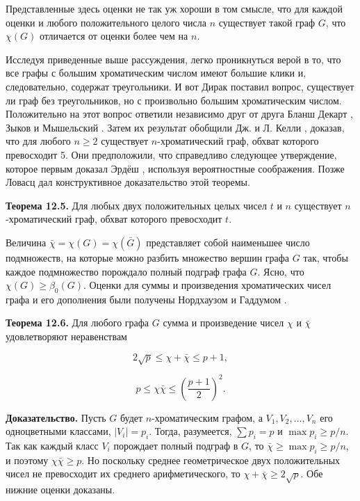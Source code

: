 Представленные здесь оценки не так уж хороши в том смысле, что для каждой оценки и любого положительного целого числа $n$ существует такой граф $G$, что $\chi(G)$ отличается от оценки более чем на $n$.

Исследуя приведенные выше рассуждения, легко проникнуться верой в то, что все графы с большим хроматическим числом имеют большие клики и, следовательно, содержат треугольники. И вот Дирак \cite{Dirac} поставил вопрос, существует ли граф без треугольников, но с произвольно большим хроматическим числом. Положительно на этот вопрос ответили независимо друг от друга Бланш Декарт \cite{Blanche}, Зыков \cite{Zykov} и Мышельский \cite{Myshelski}. Затем их результат обобщили Дж. и Л. Келли \cite{Kelly}, доказав, что для любого $n \geq 2$ существует $n$-хроматический граф, обхват которого превосходит 5. Они предположили, что справедливо следующее утверждение, которое первым доказал Эрдёш \cite{Erdos}, используя вероятностные соображения. Позже Ловасц \cite{Lovasz} дал конструктивное доказательство этой теоремы.

\textbf{Теорема 12.5.} Для любых двух положительных целых чисел $t$ и $n$ существует $n$-хроматический граф, обхват которого превосходит $t$.

Величина $\bar{\chi} = \chi(G) = \chi(\bar{G})$ представляет собой наименьшее число подмножеств, на которые можно разбить множество вершин графа $G$ так, чтобы каждое подмножество порождало полный подграф графа $G$. Ясно, что $\chi(G) \geq \beta_0(G)$. Оценки для суммы и произведения хроматических чисел графа и его дополнения были получены Нордхаузом и Гаддумом \cite{Nordhaus}.

\textbf{Теорема 12.6.} Для любого графа $G$ сумма и произведение чисел $\chi$ и $\bar{\chi}$ удовлетворяют неравенствам

\begin{equation}
2\sqrt{p} \leq \chi + \bar{\chi} \leq p + 1, \tag{12.4}
\end{equation}

\begin{equation}
p \leq \chi \bar{\chi} \leq \left( \frac{p + 1}{2} \right)^2. \tag{12.5}
\end{equation}

\textbf{Доказательство.} Пусть $G$ будет $n$-хроматическим графом, а $V_1, V_2, \ldots, V_n$ его одноцветными классами, $|V_i| = p_i$. Тогда, разумеется, $\sum p_i = p$ и $\max p_i \geq p/n$. Так как каждый класс $V_i$ порождает полный подграф в $G$, то $\bar{\chi} \geq \max p_i \geq p/n$, и поэтому $\chi \bar{\chi} \geq p$. Но поскольку среднее геометрическое двух положительных чисел не превосходит их среднего арифметического, то $\chi + \bar{\chi} \geq 2\sqrt{p}$. Обе нижние оценки доказаны.

